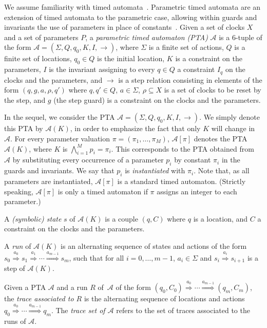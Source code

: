 \documentclass[a4paper,10pt]{article}
\newcommand{\A}{\mathcal{A}}
\newcommand{\fleche}[1]{\stackrel{#1}{\rightarrow}}
\newcommand{\Fleche}[1]{\stackrel{#1}{\Rightarrow}}
\newcommand{\steps}[0]{ {\rightarrow} }
\begin{document}
We assume familiarity with timed automata~\cite{ad94}.
Parametric timed automata are an extension of timed automata to the parametric case, allowing within guards and invariants the use of parameters in place of constants~\cite{ahv93}.
Given a set of clocks $X$ and a set of parameters $P$, a {\em parametric timed automaton (PTA)} $\A$ is a $6$-tuple of the form
\mbox{$\A=(\Sigma, Q, q_{0}, K, I, \steps)$},
where
$\Sigma$ is a finite set of actions,
$Q$ is a finite set of locations,
$q_{0} \in Q$ is the initial location,
$K$ is a constraint on the parameters, %
$I$ is the invariant assigning to every $q\in Q$
a constraint $I_q$ on the clocks and the parameters, and
$\steps$ is a step %
relation consisting in elements of the form $(q,g,a,\rho,q')$  %
 where
$q,q'\in Q$, $a\in\Sigma$, $\rho\subseteq X$ is a set of clocks to be reset by the step, and
$g$ (the step guard) is a constraint on the clocks and the parameters.

In the sequel, we consider the PTA $\A = (\Sigma, Q, q_{0}, K, I, \steps)$.
We simply denote this PTA by $\A(K)$, in order to emphasize the fact that only $K$ will change in $\A$.
% 
For every parameter valuation \(\pi = (\pi_1, \dots, \pi_{M})\),
\(\A[\pi]\) denotes the PTA
\(\A(K)\),
where $K$ is $\bigwedge_{i = 1}^M p_i = \pi_i$.
This corresponds to the PTA obtained from~$\A$ by substituting every occurrence of a parameter \(p_i\) by constant \(\pi_i\) in the guards and invariants.
We say that $p_i$ is \emph{instantiated} with $\pi_i$.
Note that, as all parameters are instantiated, $\A[\pi]$ is a standard timed automaton.
(Strictly speaking, $\A[\pi]$ is only a timed automaton if $\pi$ assigns an integer to each parameter.)

A {\em (symbolic) state} $s$ of $\A(K)$ is a couple $(q, C)$ where $q$ is a location, and $C$ a constraint on the clocks and the parameters.

A {\em run} of $\A(K)$ %
is an  alternating sequence of states and actions of the form
$s_0 \Fleche{a_0} s_1\Fleche {a_1} \cdots \Fleche{a_{m-1}} s_m$,
such that for all $i = 0, \dots, m-1$,
$a_i \in \Sigma$ and $s_i \Fleche{a_i}s_{i+1}$ is a step of $\A(K)$.

Given a PTA $\A$ and a run $R$ of~$\A$ of the form $(q_0, C_0) \Fleche{a_0} \cdots \Fleche{a_{m-1}} (q_m, C_m)$, the \emph{trace associated to $R$} is the alternating sequence of locations and actions
$q_0 \Fleche{a_0} \cdots \Fleche{a_{m-1}} q_m$.
The \emph{trace set of $\A$} refers to the set of traces associated to the runs of $\A$.
\end{document}
